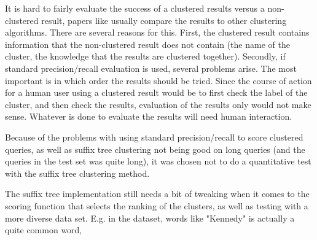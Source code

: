 It is hard to fairly evaluate the success of a clustered results versus a non-clustered result, papers like \cite{zamir} usually compare the results to other clustering algorithms. There are several reasons for this. First, the clustered result contains information that the non-clustered result does not contain (the name of the cluster, the knowledge that the results are clustered together). Secondly, if standard precision/recall evaluation is used, several problems arise. The most important is in which order the results should be tried. Since the course of action for a human user using a clustered result would be to first check the label of the cluster, and then check the results, evaluation of the results only would not make sense. Whatever is done to evaluate the results will need human interaction. 

Because of the problems with using standard precision/recall to score clustered queries, as well as suffix tree clustering not being good on long queries (and the queries in the test set was quite long), it was chosen not to do a quantitative test with the suffix tree clustering method. 

The suffix tree implementation still needs a bit of tweaking when it comes to the scoring function that selects the ranking of the clusters, as well as testing with a more diverse data set. E.g. in the dataset, words like "Kennedy" is actually a quite common word, 